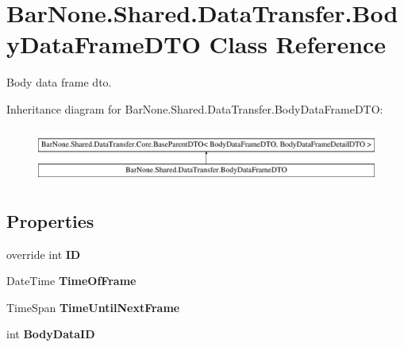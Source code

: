 \hypertarget{class_bar_none_1_1_shared_1_1_data_transfer_1_1_body_data_frame_d_t_o}{}\section{Bar\+None.\+Shared.\+Data\+Transfer.\+Body\+Data\+Frame\+D\+TO Class Reference}
\label{class_bar_none_1_1_shared_1_1_data_transfer_1_1_body_data_frame_d_t_o}


Body data frame dto.  


Inheritance diagram for Bar\+None.\+Shared.\+Data\+Transfer.\+Body\+Data\+Frame\+D\+TO\+:\begin{figure}[H]
\begin{center}
\leavevmode
\includegraphics[height=1.809370cm]{class_bar_none_1_1_shared_1_1_data_transfer_1_1_body_data_frame_d_t_o}
\end{center}
\end{figure}
\subsection*{Properties}
\begin{DoxyCompactItemize}
\item 
\mbox{\label{class_bar_none_1_1_shared_1_1_data_transfer_1_1_body_data_frame_d_t_o_a3753eb49fe96fe5cb01b5a79712486dd}} 
override int {\bfseries ID}
\item 
\mbox{\label{class_bar_none_1_1_shared_1_1_data_transfer_1_1_body_data_frame_d_t_o_a0eb7aa1ab8a1fe8253b889487ac75346}} 
Date\+Time {\bfseries Time\+Of\+Frame}
\item 
\mbox{\label{class_bar_none_1_1_shared_1_1_data_transfer_1_1_body_data_frame_d_t_o_a763a9e98006a3bd9568f37d714d81775}} 
Time\+Span {\bfseries Time\+Until\+Next\+Frame}
\item 
\mbox{\label{class_bar_none_1_1_shared_1_1_data_transfer_1_1_body_data_frame_d_t_o_a2f96583e71c001be8536ccc9f3948d4c}} 
int {\bfseries Body\+Data\+ID}
\end{DoxyCompactItemize}


